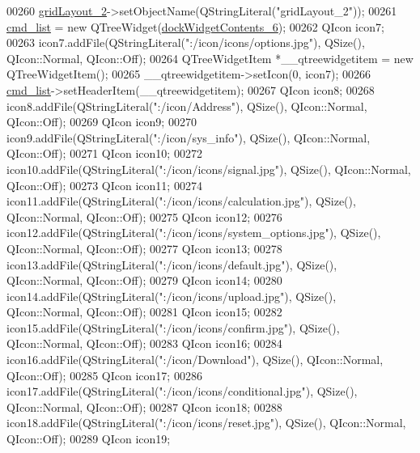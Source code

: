 \begin{DoxyCode}
00260         \hyperlink{a00080_a6b2a0c5f7e8ff2a87134908dd770d2d2}{gridLayout\_2}->setObjectName(QStringLiteral(\textcolor{stringliteral}{"gridLayout\_2"}));
00261         \hyperlink{a00080_aa66ece71395b435e915d384fb63bac1d}{cmd\_list} = \textcolor{keyword}{new} QTreeWidget(\hyperlink{a00080_a23b450a9debad2b0fecc6f063772caf2}{dockWidgetContents\_6});
00262         QIcon icon7;
00263         icon7.addFile(QStringLiteral(\textcolor{stringliteral}{":/icon/icons/options.jpg"}), QSize(), QIcon::Normal, QIcon::Off);
00264         QTreeWidgetItem *\_\_qtreewidgetitem = \textcolor{keyword}{new} QTreeWidgetItem();
00265         \_\_qtreewidgetitem->setIcon(0, icon7);
00266         \hyperlink{a00080_aa66ece71395b435e915d384fb63bac1d}{cmd\_list}->setHeaderItem(\_\_qtreewidgetitem);
00267         QIcon icon8;
00268         icon8.addFile(QStringLiteral(\textcolor{stringliteral}{":/icon/Address"}), QSize(), QIcon::Normal, QIcon::Off);
00269         QIcon icon9;
00270         icon9.addFile(QStringLiteral(\textcolor{stringliteral}{":/icon/sys\_info"}), QSize(), QIcon::Normal, QIcon::Off);
00271         QIcon icon10;
00272         icon10.addFile(QStringLiteral(\textcolor{stringliteral}{":/icon/icons/signal.jpg"}), QSize(), QIcon::Normal, QIcon::Off);
00273         QIcon icon11;
00274         icon11.addFile(QStringLiteral(\textcolor{stringliteral}{":/icon/icons/calculation.jpg"}), QSize(), QIcon::Normal, QIcon::Off);
00275         QIcon icon12;
00276         icon12.addFile(QStringLiteral(\textcolor{stringliteral}{":/icon/icons/system\_options.jpg"}), QSize(), QIcon::Normal, 
      QIcon::Off);
00277         QIcon icon13;
00278         icon13.addFile(QStringLiteral(\textcolor{stringliteral}{":/icon/icons/default.jpg"}), QSize(), QIcon::Normal, QIcon::Off);
00279         QIcon icon14;
00280         icon14.addFile(QStringLiteral(\textcolor{stringliteral}{":/icon/icons/upload.jpg"}), QSize(), QIcon::Normal, QIcon::Off);
00281         QIcon icon15;
00282         icon15.addFile(QStringLiteral(\textcolor{stringliteral}{":/icon/icons/confirm.jpg"}), QSize(), QIcon::Normal, QIcon::Off);
00283         QIcon icon16;
00284         icon16.addFile(QStringLiteral(\textcolor{stringliteral}{":/icon/Download"}), QSize(), QIcon::Normal, QIcon::Off);
00285         QIcon icon17;
00286         icon17.addFile(QStringLiteral(\textcolor{stringliteral}{":/icon/icons/conditional.jpg"}), QSize(), QIcon::Normal, QIcon::Off);
00287         QIcon icon18;
00288         icon18.addFile(QStringLiteral(\textcolor{stringliteral}{":/icon/icons/reset.jpg"}), QSize(), QIcon::Normal, QIcon::Off);
00289         QIcon icon19;

\end{DoxyCode}
